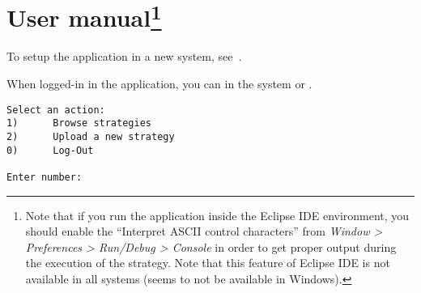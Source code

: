 \chapter[User manual]{User manual\footnote{Note that if you run the
application inside the Eclipse IDE environment, you should enable the
``Interpret ASCII control characters'' from \textit{Window > Preferences >
Run/Debug > Console} in order to get proper output during the execution of the
strategy. Note that this feature of Eclipse IDE is not available in all systems
(seems to not be available in Windows).}}\label{ch:manual}

To setup the application in a new system, see~.



When logged-in in the application, you can  in the system or .

\begin{verbatim}
Select an action:
1)      Browse strategies
2)      Upload a new strategy
0)      Log-Out

Enter number:
\end{verbatim}




